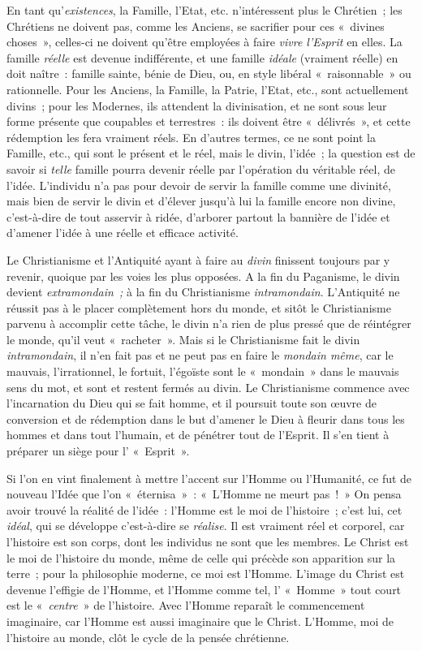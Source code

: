 \documentclass[french,twoside]{book} %
\begin{document}
En tant qu’\emph{existences}, la Famille, l’Etat, etc. n’intéressent plus le Chrétien ; les Chrétiens ne doivent pas, comme les Anciens, se sacrifier pour ces « divines choses », celles-ci ne doivent qu’être employées à faire \emph{vivre l’Esprit} en elles. La famille \emph{réelle} est devenue indifférente, et une famille \emph{idéale} (vraiment réelle) en doit naître : famille sainte, bénie de Dieu, ou, en style libéral « raisonnable » ou rationnelle. Pour les Anciens, la Famille, la Patrie, l’Etat, etc., sont actuellement divins ; pour les Modernes, ils attendent la divinisation, et ne sont sous leur forme présente que coupables et terrestres : ils doivent être « délivrés », et cette rédemption les fera vraiment réels. En d’autres termes, ce ne sont point la Famille, etc., qui sont le présent et le réel, mais le divin, l’idée ; la question est de savoir si \emph{telle} famille pourra devenir réelle par l’opération du véritable réel, de l’idée. L’individu n’a pas pour devoir de servir la  famille comme une divinité, mais bien de servir le divin et d’élever jusqu’à lui la famille encore non divine, c’est-à-dire de tout asservir à ridée, d’arborer partout la bannière de l’idée et d’amener l’idée à une réelle et efficace activité.\par
Le Christianisme et l’Antiquité ayant à faire au \emph{divin} finissent toujours par y revenir, quoique par les voies les plus opposées. A la fin du Paganisme, le divin devient \emph{extramondain ;} à la fin du Christianisme \emph{intramondain}. L’Antiquité ne réussit pas à le placer complètement hors du monde, et sitôt le Christianisme parvenu à accomplir cette tâche, le divin n’a rien de plus pressé que de réintégrer le monde, qu’il veut « racheter ». Mais si le Christianisme fait le divin \emph{intramondain}, il n’en fait pas et ne peut pas en faire le \emph{mondain même}, car le mauvais, l’irrationnel, le fortuit, l’égoïste sont le « mondain » dans le mauvais sens du mot, et sont et restent fermés au divin. Le Christianisme commence avec l’incarnation du Dieu qui se fait homme, et il poursuit toute son œuvre de conversion et de rédemption dans le but d’amener le Dieu à fleurir dans tous les hommes et dans tout l’humain, et de pénétrer tout de l’Esprit. Il s’en tient à préparer un siège pour l’ « Esprit ».\par
Si l’on en vint finalement à mettre l’accent sur l’Homme ou l’Humanité, ce fut de nouveau l’Idée que l’on « éternisa » : « L’Homme ne meurt pas ! » On pensa avoir trouvé la réalité de l’idée : l’Homme est le moi de l’histoire ; c’est lui, cet \emph{idéal}, qui se développe c’est-à-dire se \emph{réalise}. Il est vraiment réel et corporel, car l’histoire est son corps, dont les individus ne sont que les membres. Le Christ est le moi de l’histoire du monde, même de celle qui précède son apparition sur la terre ; pour la philosophie moderne, ce moi est l’Homme. L’image du Christ est devenue l’effigie de l’Homme, et l’Homme comme tel, l’ « Homme » tout court est le « \emph{centre} » de l’histoire. Avec l’Homme reparaît le commencement imaginaire,  car l’Homme est aussi imaginaire que le Christ. L’Homme, moi de l’histoire au monde, clôt le cycle de la pensée chrétienne.\par
\end{document}
